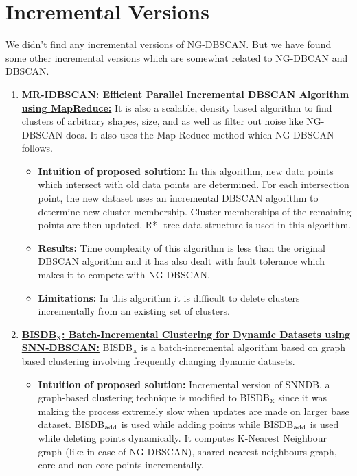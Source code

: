 \documentclass[acmsmall]{acmart}
\begin{document}
\section* {Incremental Versions}
We didn't find any incremental versions of NG-DBSCAN. But we have found some other incremental versions which are somewhat related to NG-DBCAN and DBSCAN.
\begin{enumerate}
    \item \textcolor{blue}{\textbf{\href{https://citeseerx.ist.psu.edu/viewdoc/download?doi=10.1.1.678.8143&rep=rep1&type=pdf
    }{MR-IDBSCAN: Efficient Parallel Incremental DBSCAN Algorithm using MapReduce:}}}
    It is also a scalable, density based algorithm to find clusters of arbitrary shapes, size, and as well as filter out noise like NG-DBSCAN does. It also uses the Map Reduce method which NG-DBSCAN follows. 
    \begin{itemize}
        \item \textbf{Intuition of proposed solution:} In this algorithm, new data points which intersect with old data points are determined. For each intersection point, the new dataset uses an incremental DBSCAN algorithm to determine new cluster membership. Cluster memberships of the remaining points are then updated. R*- tree data structure is used in this algorithm.
        \item \textbf{Results:} Time complexity of this algorithm is less than the original DBSCAN  algorithm and it has also dealt with fault tolerance which makes it to compete with NG-DBSCAN.
        \item \textbf{Limitations:} In this algorithm it is difficult to delete clusters incrementally from an existing set of clusters.
    \end{itemize}
    \vspace{5pt}
    \item \textcolor{blue}{\textbf{\href{https://link.springer.com/article/10.1007\%2Fs10044-019-00831-1}{BISDB$\textsubscript{x}$: Batch‑Incremental Clustering for Dynamic Datasets using SNN‑DBSCAN:}}}
    BISDB$\textsubscript{x}$ is a batch-incremental algorithm based on graph based clustering involving frequently changing dynamic datasets.
    \begin{itemize}
        \item \textbf{Intuition of proposed solution:}  Incremental version of SNNDB, a graph-based clustering technique is modified to BISDB$\textsubscript{x}$ since it was making the process extremely slow when updates are made on larger base dataset. BISDB$\textsubscript{add}$ is used while adding points while BISDB$\textsubscript{add}$ is used while deleting points dynamically. It computes K-Nearest Neighbour graph (like in case of NG-DBSCAN), shared nearest neighbours graph, core and non-core points incrementally.

\end{itemize}
\end{enumerate}
\end{document}
